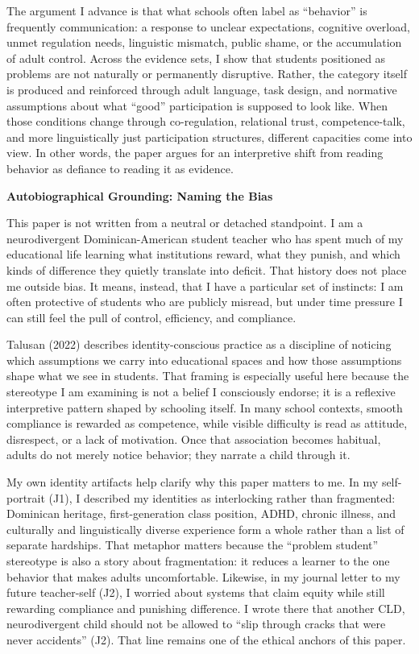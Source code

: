 \documentclass[12pt]{article}
\newcommand{\levelone}[1]{\begin{center}\textbf{#1}\end{center}}
\newcommand{\JournalArtifact}[1]{\textsc{J#1}}
\begin{document}
The argument I advance is that what schools often label as ``behavior'' is frequently communication: a response to unclear expectations, cognitive overload, unmet regulation needs, linguistic mismatch, public shame, or the accumulation of adult control. Across the evidence sets, I show that students positioned as problems are not naturally or permanently disruptive. Rather, the category itself is produced and reinforced through adult language, task design, and normative assumptions about what ``good'' participation is supposed to look like. When those conditions change through co-regulation, relational trust, competence-talk, and more linguistically just participation structures, different capacities come into view. In other words, the paper argues for an interpretive shift from reading behavior as defiance to reading it as evidence.

\levelone{Autobiographical Grounding: Naming the Bias}

This paper is not written from a neutral or detached standpoint. I am a neurodivergent Dominican-American student teacher who has spent much of my educational life learning what institutions reward, what they punish, and which kinds of difference they quietly translate into deficit. That history does not place me outside bias. It means, instead, that I have a particular set of instincts: I am often protective of students who are publicly misread, but under time pressure I can still feel the pull of control, efficiency, and compliance.

Talusan (2022) describes identity-conscious practice as a discipline of noticing which assumptions we carry into educational spaces and how those assumptions shape what we see in students. That framing is especially useful here because the stereotype I am examining is not a belief I consciously endorse; it is a reflexive interpretive pattern shaped by schooling itself. In many school contexts, smooth compliance is rewarded as competence, while visible difficulty is read as attitude, disrespect, or a lack of motivation. Once that association becomes habitual, adults do not merely notice behavior; they narrate a child through it.

My own identity artifacts help clarify why this paper matters to me. In my self-portrait (\JournalArtifact{1}), I described my identities as interlocking rather than fragmented: Dominican heritage, first-generation class position, ADHD, chronic illness, and culturally and linguistically diverse experience form a whole rather than a list of separate hardships. That metaphor matters because the ``problem student'' stereotype is also a story about fragmentation: it reduces a learner to the one behavior that makes adults uncomfortable. Likewise, in my journal letter to my future teacher-self (\JournalArtifact{2}), I worried about systems that claim equity while still rewarding compliance and punishing difference. I wrote there that another CLD, neurodivergent child should not be allowed to ``slip through cracks that were never accidents'' (\JournalArtifact{2}). That line remains one of the ethical anchors of this paper.
\end{document}
